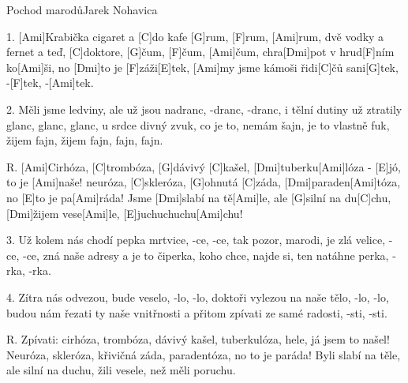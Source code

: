 \begin{song}{Pochod marodů}{Jarek Nohavica}

\begin{xverse}{1. }
[Ami]Krabička cigaret a [C]do kafe [G]rum, [F]rum, [Ami]rum,
dvě vodky a fernet a teď, [C]doktore, [G]{čum}, [F]{čum}, [Ami]{čum},
chra[Dmi]pot v hrud[F]ním ko[Ami]{ši}, no [Dmi]to je [F]záži[E]tek,
[Ami]my jsme kámoši řidi[C]{čů} sani[G]tek, -[F]tek, -[Ami]tek.
\end{xverse}


\begin{xverse}{2. }
Měli jsme ledviny, ale už jsou nadranc, -dranc, -dranc,
i tělní dutiny už ztratily glanc, glanc, glanc,
u srdce divný zvuk, co je to, nemám šajn,
je to vlastně fuk, žijem fajn, žijem fajn, fajn, fajn.
\end{xverse}


\begin{xverse}{R. }
[Ami]Cirhóza, [C]trombóza, [G]dávivý [C]kašel,
[Dmi]tuberku[Ami]lóza - [E]jó, to je [Ami]naše!
neuróza, [C]skleróza, [G]ohnutá [C]záda,
[Dmi]paraden[Ami]tóza, no [E]to je pa[Ami]ráda!
Jsme [Dmi]slabí na tě[Ami]le, ale [G]silní na du[C]chu,
[Dmi]{ži}jem vese[Ami]le, [E]juchuchuchu[Ami]chu!
\end{xverse}


\begin{xverse}{3. }
Už kolem nás chodí pepka mrtvice, -ce, -ce,
tak pozor, marodi, je zlá velice, -ce, -ce,
zná naše adresy a je to čiperka,
koho chce, najde si, ten natáhne perka, -rka, -rka.
\end{xverse}


\begin{xverse}{4. }
Zítra nás odvezou, bude veselo, -lo, -lo,
doktoři vylezou na naše tělo, -lo, -lo,
budou nám řezati ty naše vnitřnosti
a přitom zpívati ze samé radosti, -sti, -sti.
\end{xverse}


\begin{xverse}{R. }
Zpívati: cirhóza, trombóza, dávivý kašel,
tuberkulóza, hele, já jsem to našel!
Neuróza, skleróza, křivičná záda,
paradentóza, no to je paráda!
Byli slabí na těle, ale silní na duchu,
žili vesele, než měli poruchu.
\end{xverse}

\end{song}

